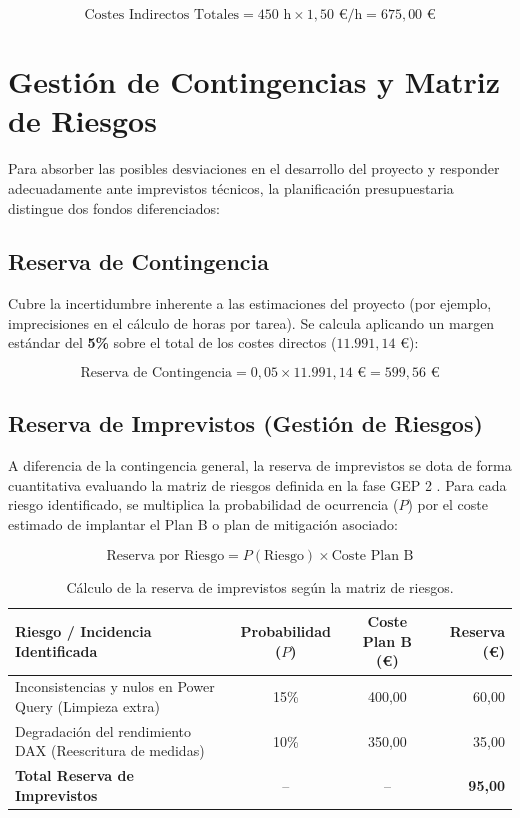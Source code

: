 \documentclass[12pt, a4paper, twoside]{report}
\begin{document}
\begin{equation}
\text{Costes Indirectos Totales} = 450 \text{ h} \times 1,50 \text{ €/h} = 675,00 \text{ €}
\end{equation}

\section{Gestión de Contingencias y Matriz de Riesgos}
Para absorber las posibles desviaciones en el desarrollo del proyecto y responder adecuadamente ante imprevistos técnicos, la planificación presupuestaria distingue dos fondos diferenciados:

\subsection{Reserva de Contingencia}
Cubre la incertidumbre inherente a las estimaciones del proyecto (por ejemplo, imprecisiones en el cálculo de horas por tarea). Se calcula aplicando un margen estándar del \textbf{5\%} sobre el total de los costes directos ($11.991,14 \text{ €}$):

\begin{equation}
\text{Reserva de Contingencia} = 0,05 \times 11.991,14 \text{ €} = 599,56 \text{ €}
\end{equation}

\subsection{Reserva de Imprevistos (Gestión de Riesgos)}
A diferencia de la contingencia general, la reserva de imprevistos se dota de forma cuantitativa evaluando la matriz de riesgos definida en la fase GEP 2 \cite{fib_costos}. Para cada riesgo identificado, se multiplica la probabilidad de ocurrencia ($P$) por el coste estimado de implantar el Plan B o plan de mitigación asociado:

\begin{equation}
\text{Reserva por Riesgo} = P(\text{Riesgo}) \times \text{Coste Plan B}
\end{equation}

\begin{table}[H]
\centering
\caption{Cálculo de la reserva de imprevistos según la matriz de riesgos.}
\label{tab:reserva_riesgos}
\small
\renewcommand{\arraystretch}{0.85}
\setlength{\tabcolsep}{4pt}
\begin{tabularx}{\textwidth}{@{} X c c r @{}}
\toprule
\textbf{Riesgo / Incidencia Identificada} & \textbf{Probabilidad ($P$)} & \textbf{Coste Plan B (€)} & \textbf{Reserva (€)} \\ \midrule
Inconsistencias y nulos en Power Query (Limpieza extra) & 15\% & 400,00 & 60,00 \\ \addlinespace[2pt]
Degradación del rendimiento DAX (Reescritura de medidas) & 10\% & 350,00 & 35,00 \\ \midrule
\textbf{Total Reserva de Imprevistos} & -- & -- & \textbf{95,00} \\ \bottomrule
\end{tabularx}
\end{table}
\end{document}
